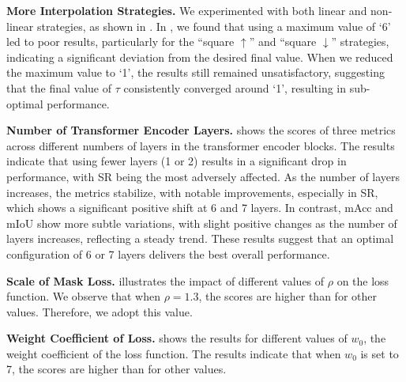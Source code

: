 \textbf{More Interpolation Strategies.} We experimented with both linear and non-linear strategies, as shown in . In , we found that using a maximum value of `6' led to poor results, particularly for the ``square $\uparrow$'' and ``square $\downarrow$'' strategies, indicating a significant deviation from the desired final value. When we reduced the maximum value to `1', the results still remained unsatisfactory, suggesting that the final value of $\tau$ consistently converged around `1', resulting in sub-optimal performance.




\textbf{Number of Transformer Encoder Layers.}  shows the scores of three metrics across different numbers of layers in the transformer encoder blocks. The results indicate that using fewer layers (1 or 2) results in a significant drop in performance, with SR being the most adversely affected. As the number of layers increases, the metrics stabilize, with notable improvements, especially in SR, which shows a significant positive shift at 6 and 7 layers. In contrast, mAcc and mIoU show more subtle variations, with slight positive changes as the number of layers increases, reflecting a steady trend. These results suggest that an optimal configuration of 6 or 7 layers delivers the best overall performance.

\textbf{Scale of Mask Loss.}  illustrates the impact of different values of $\rho$ on the loss function. We observe that when $\rho=1.3$, the scores are higher than for other values. Therefore, we adopt this value.

\textbf{Weight Coefficient of Loss.}  shows the results for different values of $w_0$, the weight coefficient of the loss function. The results indicate that when $w_0$ is set to 7, the scores are higher than for other values. 


\begin{table}[htbp]
\centering
\caption{\textcolor{orange}{Performance comparison of T and M.}}
\label{tab:M_exp}
\end{table}


